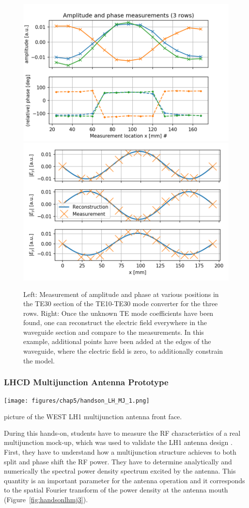 \begin{figure}
	\centering
	\includegraphics[width=0.49\linewidth]{figures/chap5/handson_LH_5}
	\includegraphics[width=0.49\linewidth]{figures/chap5/handson_LH_6}
	\caption{Left: Measurement of amplitude and phase at various positions in the TE30 section of the TE10-TE30 mode converter for the three rows. Right: Once the unknown TE mode coefficients have been found, one can reconstruct the electric field everywhere in the waveguide section and compare to the measurements. In this example, additional points have been added at the edges of the waveguide, where the electric field is zero, to additionally constrain the model.}
	\label{fig:handsonlh5}
\end{figure}


\subsubsection{LHCD Multijunction Antenna Prototype}

\begin{marginfigure}
	\centering
	\texttt{[image: figures/chap5/handson\_LH\_MJ\_1.png]}
	\caption{picture of the WEST LH1 multijunction antenna front face.}
	\label{fig:handsonlhmj1}
\end{marginfigure}

During this hands-on, students have to measure the RF characteristics of a real multijunction mock-up, which was used to validate the LH1 antenna design \cite{bibet2000}. First, they have to understand how a multijunction structure achieves to both split and phase shift the RF power. They have to determine analytically and numerically the spectral power density spectrum excited by the antenna. This quantity is an important parameter for the antenna operation and it corresponds to the spatial Fourier transform of the power density at the antenna mouth (Figure~\ref{fig:handsonlhmj3}).

